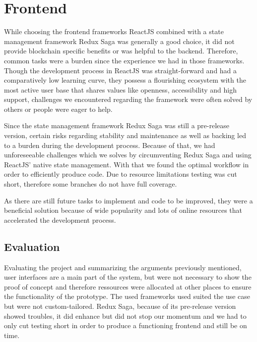 \section{Frontend}
\label{sec:frontendEval}

While choosing the frontend frameworks ReactJS combined with a state management framework Redux Saga was generally a good choice, it
did not provide blockchain specific benefits or was helpful to the backend. Therefore, common tasks were a burden since
the experience we had in those frameworks.
Though the development process in ReactJS was straight-forward and had a comparatively low learning curve,
they possess a flourishing ecosystem with the most active user base that shares values like openness, accessibility and
high support, challenges we encountered regarding the framework were often solved by others or people were eager to help.

Since the state management framework Redux Saga was still a pre-release version, certain risks regarding stability and
maintenance as well as backing led to a burden during the development process.
Because of that, we had unforeseeable challenges which we solves by circumventing Redux Saga and using ReactJS' native
state management. With that we found the optimal workflow in order to efficiently produce code.
Due to resource limitations testing was cut short, therefore some branches do not have full coverage.

As there are still future tasks to implement and code to be improved, they were a beneficial solution because of wide popularity
and lots of online resources that accelerated the development process.

\subsection{Evaluation}
\label{ssec:frontendEvalEval}
Evaluating the project and summarizing the arguments previously mentioned,
user interfaces are a main part of the system, but were not necessary to show the proof of concept and therefore ressources
were allocated at other places to ensure the functionality of the prototype.
The used frameworks used suited the use case but were not custom-tailored. Redux Saga, because of its pre-release version
showed troubles, it did enhance but did not stop our momentum and we had to only cut testing short in order to produce
a functioning frontend and still be on time.

